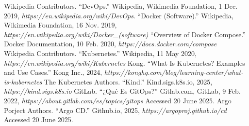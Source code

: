 \begin{thebibliography}{99}
 Wikipedia Contributors. ``DevOps.'' Wikipedia, Wikimedia Foundation, 1 Dec. 2019, {\it https://en.wikipedia.org/wiki/DevOps}.
``Docker (Software).'' Wikipedia, Wikimedia Foundation, 16 Nov. 2019, {\it https://en.wikipedia.org/wiki/Docker\_(software)}
 ``Overview of Docker Compose.'' Docker Documentation, 10 Feb. 2020, {\it https://docs.docker.com/compose}
 Wikipedia Contributors. ``Kubernetes.'' Wikipedia, 11 May 2020, {\it https://en.wikipedia.org/wiki/Kubernetes}
 Kong. ``What Is Kubernetes? Examples and Use Cases.'' Kong Inc., 2024, {\it https://konghq.com/blog/learning-center/what-is-kubernetes}
 The Kubernetes Authors. ``Kind.'' Kind.sigs.k8s.io, 2025, {\it https://kind.sigs.k8s.io}
 GitLab. ``¿Qué Es GitOps?'' Gitlab.com, GitLab, 9 Feb. 2022, {\it https://about.gitlab.com/es/topics/gitops} Accessed 20 June 2025.
 Argo Porject Authors. ``Argo CD.'' Github.io, 2025, {\it https://argoproj.github.io/cd} Accessed 20 June 2025.



\end{thebibliography}

